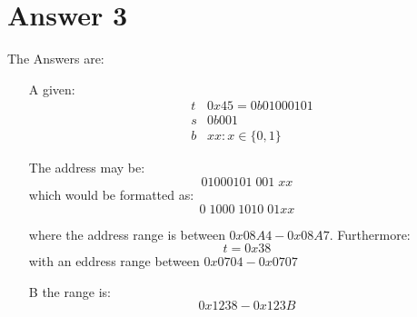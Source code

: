 \documentclass[12pt]{book}
\begin{document}
\section*{Answer 3}
The Answers are:
\begin{itemize}
        \item[A] given:
                \begin{align*}
                        &t &0x45 = 0b01000101\\
                        &s &0b001\\
                        &b &xx : x \in \{0,1\}
                \end{align*}

                The address may be:
                \[01000101\;001\;xx\]
                which would be formatted as:
                \[0\;1000\;1010\;01xx\]

                where the address range is between $0x08A4 - 0x08A7$.
                Furthermore:
                \[t = 0x38\]
                with an eddress range between $0x0704 - 0x0707$

        \item[B] the range is:
                \[0x1238 - 0x123B\]
\end{itemize}
\end{document}
